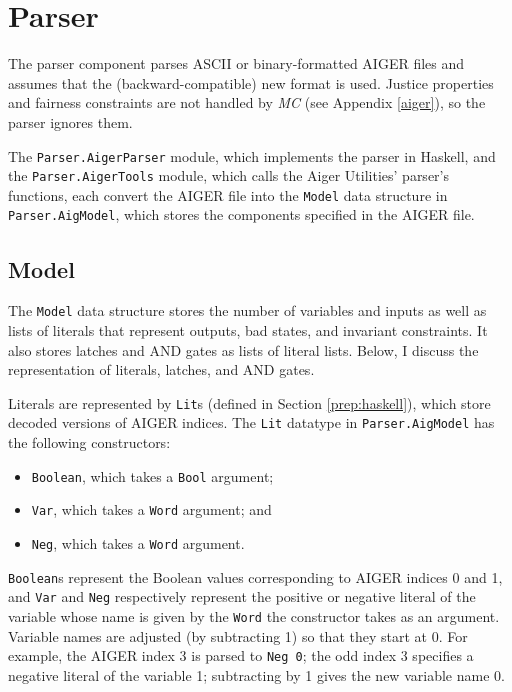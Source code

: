 \documentclass[12pt,a4paper,twoside,openright]{report}
\begin{document}
{{\section{Parser}
\label{impl:aiger}

The parser component parses ASCII or binary-formatted AIGER files and
assumes that the (backward-compatible) new format is used.
Justice properties and fairness constraints are not handled by \emph{MC} (see
Appendix \ref{aiger}), so
the parser ignores them.

The \verb,Parser.AigerParser, module, which implements the parser in Haskell, and
the \verb,Parser.AigerTools, module, which calls the Aiger Utilities' parser's functions,
each convert the AIGER file into the \verb,Model, data structure in \verb,Parser.AigModel,,
which stores the components specified in the AIGER file.

\subsection{Model}

The \verb,Model, data structure stores the number of variables and
inputs as well as lists of literals that represent outputs, bad states,
and invariant constraints. It also stores latches and AND gates as
lists of literal lists. Below, I discuss the representation of literals, latches, and
AND gates.

Literals are represented by \verb,Lit,s (defined in Section \ref{prep:haskell}),
which store decoded versions of AIGER indices. The {\tt Lit} datatype
in {\tt Parser.AigModel} has the following constructors:
\begin{itemize}
\item \verb,Boolean,, which takes a \verb,Bool, argument;
\item \verb,Var,, which takes a \verb,Word, argument; and
\item \verb,Neg,, which takes a \verb,Word, argument.
\end{itemize}
\verb,Boolean,s represent the Boolean values corresponding to AIGER indices 0 and 1,
and \verb,Var, and \verb,Neg, respectively represent the positive or negative literal
of the variable whose name is given by the \verb,Word, the constructor takes as an
argument.
Variable names are adjusted (by subtracting 1) so that they start at 0.
For example, the AIGER index 3 is parsed to \verb,Neg 0,;
the odd index 3 specifies a negative literal of the variable 1;
subtracting by 1 gives the new variable name 0.

}}
\end{document}
